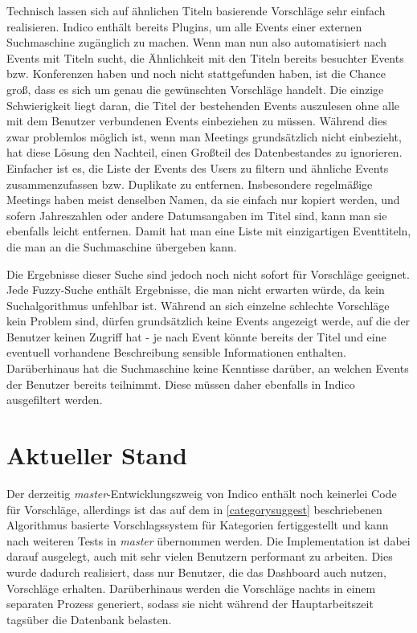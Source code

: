 Technisch lassen sich auf ähnlichen Titeln basierende Vorschläge sehr einfach realisieren. Indico
enthält bereits Plugins, um alle Events einer externen Suchmaschine zugänglich zu machen. Wenn man
nun also automatisiert nach Events mit Titeln sucht, die Ähnlichkeit mit den Titeln bereits
besuchter Events bzw. Konferenzen haben und noch nicht stattgefunden haben, ist die Chance groß,
dass es sich um genau die gewünschten Vorschläge handelt. Die einzige Schwierigkeit liegt daran, die
Titel der bestehenden Events auszulesen ohne alle mit dem Benutzer verbundenen Events einbeziehen zu
müssen. Während dies zwar problemlos möglich ist, wenn man Meetings grundsätzlich nicht einbezieht,
hat diese Lösung den Nachteil, einen Großteil des Datenbestandes zu ignorieren. Einfacher ist es,
die Liste der Events des Users zu filtern und ähnliche Events zusammenzufassen bzw. Duplikate zu
entfernen. Insbesondere regelmäßige Meetings haben meist denselben Namen, da sie einfach nur kopiert
werden, und sofern Jahreszahlen oder andere Datumsangaben im Titel sind, kann man sie ebenfalls
leicht entfernen. Damit hat man eine Liste mit einzigartigen Eventtiteln, die man an die
Suchmaschine übergeben kann.

Die Ergebnisse dieser Suche sind jedoch noch nicht sofort für Vorschläge geeignet. Jede Fuzzy-Suche
enthält Ergebnisse, die man nicht erwarten würde, da kein Suchalgorithmus unfehlbar ist. Während an
sich einzelne schlechte Vorschläge kein Problem sind, dürfen grundsätzlich keine Events angezeigt
werde, auf die der Benutzer keinen Zugriff hat - je nach Event könnte bereits der Titel und eine
eventuell vorhandene Beschreibung sensible Informationen enthalten. Darüberhinaus hat die
Suchmaschine keine Kenntisse darüber, an welchen Events der Benutzer bereits teilnimmt. Diese
müssen daher ebenfalls in Indico ausgefiltert werden.

\newpage
\section{Aktueller Stand}

Der derzeitig \emph{master}-Entwicklungszweig von Indico enthält noch keinerlei Code für Vorschläge,
allerdings ist das auf dem in \autoref{categorysuggest} beschriebenen Algorithmus basierte
Vorschlagssystem für Kategorien fertiggestellt und kann nach weiteren Tests in \emph{master}
übernommen werden. Die Implementation ist dabei darauf ausgelegt, auch mit sehr vielen Benutzern
performant zu arbeiten.  Dies wurde dadurch realisiert, dass nur Benutzer, die das Dashboard auch
nutzen, Vorschläge erhalten. Darüberhinaus werden die Vorschläge nachts in einem separaten Prozess
generiert, sodass sie nicht während der Hauptarbeitszeit tagsüber die Datenbank belasten.

